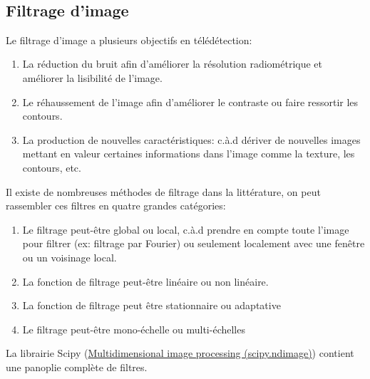 \documentclass[11pt]{article}
\begin{document}
    \begin{center}
    \end{center}
    { \hspace*{\fill} \\}
    
    \hypertarget{filtrage-dimage}{%
\subsection{Filtrage d'image}\label{filtrage-dimage}}

Le filtrage d'image a plusieurs objectifs en télédétection:

\begin{enumerate}
\def\labelenumi{\arabic{enumi}.}
\item
  La réduction du bruit afin d'améliorer la résolution radiométrique et
  améliorer la lisibilité de l'image.
\item
  Le réhaussement de l'image afin d'améliorer le contraste ou faire
  ressortir les contours.
\item
  La production de nouvelles caractéristiques: c.à.d dériver de
  nouvelles images mettant en valeur certaines informations dans l'image
  comme la texture, les contours, etc.
\end{enumerate}

Il existe de nombreuses méthodes de filtrage dans la littérature, on
peut rassembler ces filtres en quatre grandes catégories:

\begin{enumerate}
\def\labelenumi{\arabic{enumi}.}
\item
  Le filtrage peut-être global ou local, c.à.d prendre en compte toute
  l'image pour filtrer (ex: filtrage par Fourier) ou seulement
  localement avec une fenêtre ou un voisinage local.
\item
  La fonction de filtrage peut-être linéaire ou non linéaire.
\item
  La fonction de filtrage peut être stationnaire ou adaptative
\item
  Le filtrage peut-être mono-échelle ou multi-échelles
\end{enumerate}

La librairie Scipy
(\href{https://docs.scipy.org/doc/scipy/reference/ndimage.html}{Multidimensional
image processing (scipy.ndimage)}) contient une panoplie complète de
filtres.
\end{document}
